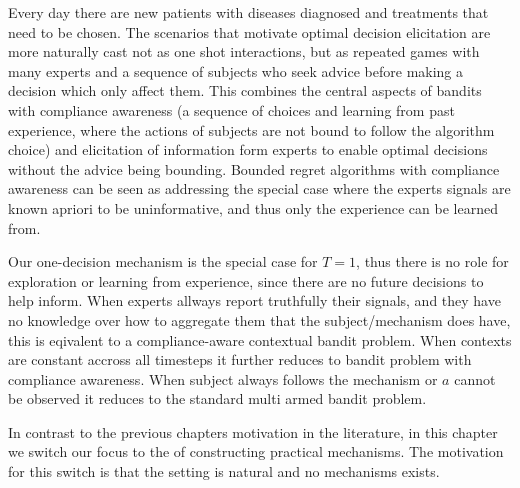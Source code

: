 



Every day there are new patients with diseases diagnosed and treatments that need to be chosen. 
The scenarios that motivate optimal decision elicitation are more naturally cast not as one shot interactions, but as repeated games with many experts and a sequence of subjects who seek advice before making a decision which only affect them.
This combines the central aspects of bandits with compliance awareness (a sequence of choices and learning from past experience, where the actions of subjects are not bound to follow the algorithm choice) and elicitation of information form experts to enable optimal decisions without the advice being bounding. 
Bounded regret algorithms with compliance awareness can be seen as addressing the special case where the experts signals are known apriori to be uninformative, and thus only the experience can be learned from.

Our one-decision mechanism is the special case for $T={1}$, thus there is no role for exploration or learning from experience, since there are no future decisions  to help inform.
When experts allways report truthfully their signals, and they have no knowledge over how to aggregate them that the subject/mechanism does have,  this is eqivalent to a compliance-aware contextual bandit problem. 
When contexts are constant accross all timesteps it further reduces to bandit problem with compliance awareness.
When subject always follows the mechanism or $a$ cannot be observed it reduces to the standard multi armed bandit problem. 

 
In contrast to the previous chapters motivation in the literature, in this chapter we switch our focus to the of constructing practical mechanisms. 
The motivation for this switch is that the setting is natural and no mechanisms exists. 

